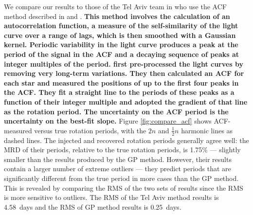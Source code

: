 \documentclass[a4paper,fleqn,usenatbib,useAMS]{mnras}
\newcommand{\ie}{{\it i.e.}}
\newcommand{\gpRMS}{0.25}
\newcommand{\telavivRMS}{4.58}
\newcommand{\percenttelavivMAD}{1.75}
\begin{document}
We compare our results to those of the Tel Aviv team in \citet{Aigrain2015}
who use the ACF method described in \citet{Mcquillan2014} and
\citet{Aigrain2015}.
{\bf This method involves the calculation of an autocorrelation function, a
measure of the self-similarity of the light curve over a range of lags, which
is then smoothed with a Gaussian kernel.
Periodic variability in the light curve produces a peak at the period of the
signal in the ACF and a decaying sequence of peaks at integer multiples of the
period.
\citet{McQuillan2014} first pre-processed the light curves by removing very
long-term variations.
They then calculated an ACF for each star and measured the positions of up to
the first four peaks in the ACF.
They fit a straight line to the periods of these peaks as a function of their
integer multiple and adopted the gradient of that line as the rotation
period.
The uncertainty on the ACF period is the uncertainty on the best-fit slope.
}
Figure \ref{fig:compare_acf} shows ACF-measured versus true rotation
periods, with the $2n$ and $\frac{1}{2}n$ harmonic lines as dashed lines.
The injected and recovered rotation periods generally agree well: the MRD of
their periods, relative to the true rotation periods, is \percenttelavivMAD\%
--- slightly smaller than the results produced by the GP method.
However, their results contain a larger number of extreme outliers --- they
predict periods that are significantly different from the true period in more
cases than the GP method.
This is revealed by comparing the RMS of the two sets of results since the RMS
is more sensitive to outliers.
The RMS of the Tel Aviv method results is \telavivRMS\ days and the RMS of GP
method results is \gpRMS\ days.

\end{document}

